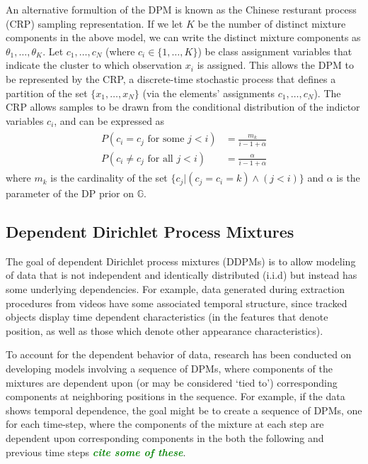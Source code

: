 \documentclass[smallcondensed, final]{svjour3}
\newcommand{\willie}[1]{\textcolor{green}{\textsf{\emph{\textbf{\textcolor{green}{#1}}}}}}
\begin{document}
An alternative formultion of the DPM is known as the Chinese resturant process (CRP) sampling representation. If we let $K$ be the number of distinct mixture components in the above model, we can write the distinct mixture components as $\theta_{1}, \ldots, \theta_{K}$. Let $c_{1}, \ldots, c_{N}$ (where $c_{i} \in \{1, \ldots, K \}$) be class assignment variables that indicate the cluster to which observation $x_{i}$ is assigned. This allows the DPM to be represented by the CRP, a discrete-time stochastic process that defines a partition of the set $\{ x_{1}, \ldots, x_{N} \}$ (via the elements' assignments $c_{1}, \ldots, c_{N}$). The CRP allows samples to be drawn from the conditional distribution of the indictor variables $c_{i}$, and can be expressed as
\begin{align}
\begin{split}
\label{crp_rep}
	P(c_{i} = c_{j} \text{  for some  } j<i) &= \frac{m_{k}}{i-1+\alpha}\\
	P(c_{i} \neq c_{j} \text{  for all  } j<i) &= \frac{\alpha}{i-1+\alpha}
\end{split}
\end{align}
where $m_{k}$ is the cardinality of the set $\{ c_{j} | (c_{j}=c_{i}=k)  \wedge  (j < i) \}$ and $\alpha$ is the parameter of the DP prior on $\mathbb{G}$.





\subsection{Dependent Dirichlet Process Mixtures}

The goal of dependent Dirichlet process mixtures (DDPMs) is to allow modeling of data that is not independent and identically distributed (i.i.d) but instead has some underlying dependencies. For example, data generated during extraction procedures from videos have some associated temporal structure, since tracked objects display time dependent characteristics (in the features that denote position, as well as those which denote other appearance characteristics).

To account for the dependent behavior of data, research has been conducted on developing models involving a sequence of DPMs, where components of the mixtures are dependent upon (or may be considered `tied to') corresponding components at neighboring positions in the sequence. For example, if the data shows temporal dependence, the goal might be to create a sequence of DPMs, one for each time-step, where the components of the mixture at each step are dependent upon corresponding components in the both the following and previous time steps \willie{cite some of these}.
\end{document}
